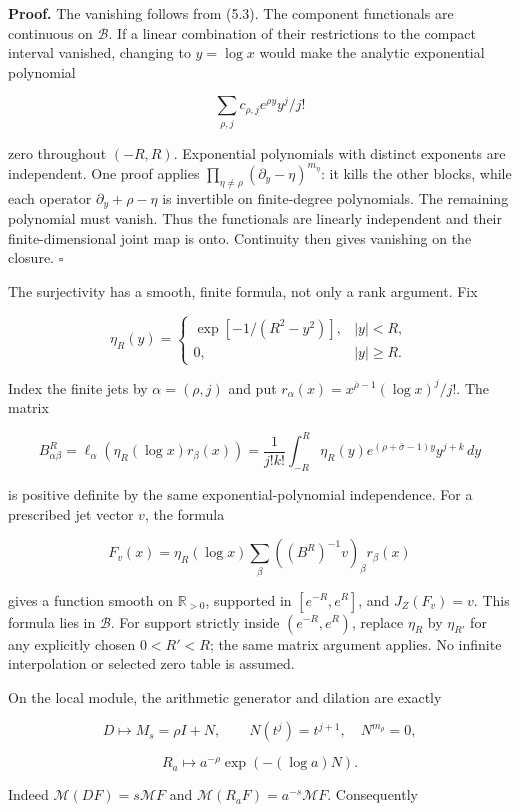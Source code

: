 \documentclass[
]{article}
\begin{document}
\textbf{Proof.} The vanishing follows from (5.3). The component
functionals are continuous on \(\mathscr B\). If a linear combination of
their restrictions to the compact interval vanished, changing to
\(y=\log x\) would make the analytic exponential polynomial

\[
\sum_{\rho,j}c_{\rho,j}e^{\rho y}y^j/j!
\]

zero throughout \((-R,R)\). Exponential polynomials with distinct
exponents are independent. One proof applies
\(\prod_{\eta\ne\rho}(\partial_y-\eta)^{m_\eta}\): it kills the other
blocks, while each operator \(\partial_y+\rho-\eta\) is invertible on
finite-degree polynomials. The remaining polynomial must vanish. Thus
the functionals are linearly independent and their finite-dimensional
joint map is onto. Continuity then gives vanishing on the closure.
\(\square\)

The surjectivity has a smooth, finite formula, not only a rank argument.
Fix

\[
\eta_R(y)=
\begin{cases}
\exp[-1/(R^2-y^2)],&|y|<R,\\
0,&|y|\ge R.
\end{cases}
\]

Index the finite jets by \(\alpha=(\rho,j)\) and put
\(r_\alpha(x)=x^{\bar\rho-1}(\log x)^j/j!\). The matrix

\[
B^R_{\alpha\beta}
=\ell_\alpha(\eta_R(\log x)r_\beta(x))
=\frac1{j!k!}\int_{-R}^R
\eta_R(y)e^{(\rho+\bar\sigma-1)y}y^{j+k}\,dy
\]

is positive definite by the same exponential-polynomial independence.
For a prescribed jet vector \(v\), the formula

\[
\boxed{F_v(x)=\eta_R(\log x)\sum_\beta((B^R)^{-1}v)_\beta r_\beta(x)}
\]

gives a function smooth on \(\mathbb R_{>0}\), supported in
\([e^{-R},e^R]\), and \(J_Z(F_v)=v\). This formula lies in
\(\mathscr B\). For support strictly inside \((e^{-R},e^R)\), replace
\(\eta_R\) by \(\eta_{R'}\) for any explicitly chosen \(0<R'<R\); the
same matrix argument applies. No infinite interpolation or selected zero
table is assumed.

On the local module, the arithmetic generator and dilation are exactly

\[
D\longmapsto M_s=\rho I+N,\qquad N(t^j)=t^{j+1},\quad N^{m_\rho}=0,
\]

\[
\boxed{R_a\longmapsto a^{-\rho}\exp(-(\log a)N).} \tag{6.1}
\]

Indeed \(\mathcal M(DF)=s\mathcal MF\) and
\(\mathcal M(R_aF)=a^{-s}\mathcal MF\). Consequently
\end{document}
